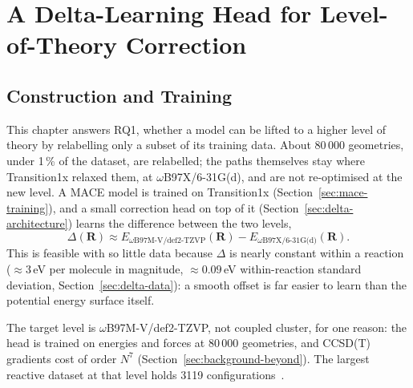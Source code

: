 %
\usetikzlibrary{positioning, arrows.meta}

\chapter{A Delta-Learning Head for Level-of-Theory Correction}
\label{ch:delta}

\section{Construction and Training}
\label{sec:delta-overview}

This chapter answers RQ1, whether a model can be lifted to a higher
level of theory by relabelling only a subset of its training data.
About 80\,000 geometries, under 1\,\% of the dataset, are relabelled;
the paths
themselves stay where Transition1x relaxed them, at
\mbox{$\omega$B97X/6-31G(d)}, and are not re-optimised at the new
level. A MACE model is trained on Transition1x
(Section~\ref{sec:mace-training}), and a small correction head on top
of it (Section~\ref{sec:delta-architecture}) learns the difference
between the two levels,
%
\begin{equation}
\Delta(\mathbf{R}) \approx E_{\omega\text{B97M-V/def2-TZVP}}(\mathbf{R}) - E_{\omega\text{B97X/6-31G(d)}}(\mathbf{R}) .
\label{eq:delta-def}
\end{equation}
%
This is feasible with so little data because $\Delta$ is nearly
constant within a reaction ($\approx 3$\,eV per molecule in magnitude,
$\approx 0.09$\,eV within-reaction standard deviation,
Section~\ref{sec:delta-data}): a smooth offset is far easier to learn
than the potential energy surface itself.

The target level is \mbox{$\omega$B97M-V/def2-TZVP}, not coupled
cluster, for one reason: the head is trained on energies and forces at
80\,000 geometries, and CCSD(T) gradients cost of order $N^7$
(Section~\ref{sec:background-beyond}). The largest reactive dataset at
that level holds 3119 configurations~\cite{allen2026}.

